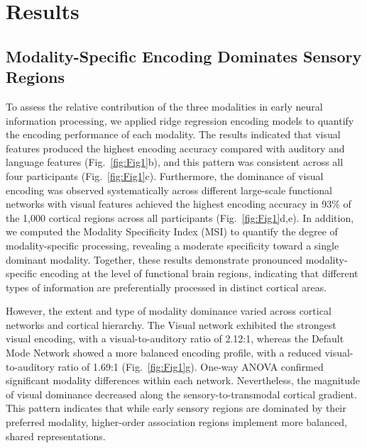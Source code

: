 \documentclass[10pt,letterpaper]{article}
\begin{document}
\section{Results}

\subsection{Modality-Specific Encoding Dominates Sensory Regions}

To assess the relative contribution of the three modalities in early neural information processing, we applied ridge regression encoding models to quantify the encoding performance of each modality. The results indicated that visual features produced the highest encoding accuracy compared with auditory and language features (Fig.~\ref{fig:Fig1}b), and this pattern was consistent across all four participants (Fig.~\ref{fig:Fig1}c). Furthermore, the dominance of visual encoding was observed systematically across different large-scale functional networks with visual features achieved the highest encoding accuracy in 93\% of the 1,000 cortical regions across all participants (Fig.~\ref{fig:Fig1}d,e). In addition, we computed the Modality Specificity Index (MSI) to quantify the degree of modality-specific processing, revealing a moderate specificity toward a single dominant modality. Together, these results demonstrate pronounced modality-specific encoding at the level of functional brain regions, indicating that different types of information are preferentially processed in distinct cortical areas.


However, the extent and type of modality dominance varied across cortical networks and cortical hierarchy. The Visual network exhibited the strongest visual encoding, with a visual-to-auditory ratio of 2.12:1, whereas the Default Mode Network showed a more balanced encoding profile, with a reduced visual-to-auditory ratio of 1.69:1 (Fig.~\ref{fig:Fig1}g). One-way ANOVA confirmed significant modality differences within each network. Nevertheless, the magnitude of visual dominance decreased along the sensory-to-transmodal cortical gradient. This pattern indicates that while early sensory regions are dominated by their preferred modality, higher-order association regions implement more balanced, shared representations.
\end{document}
